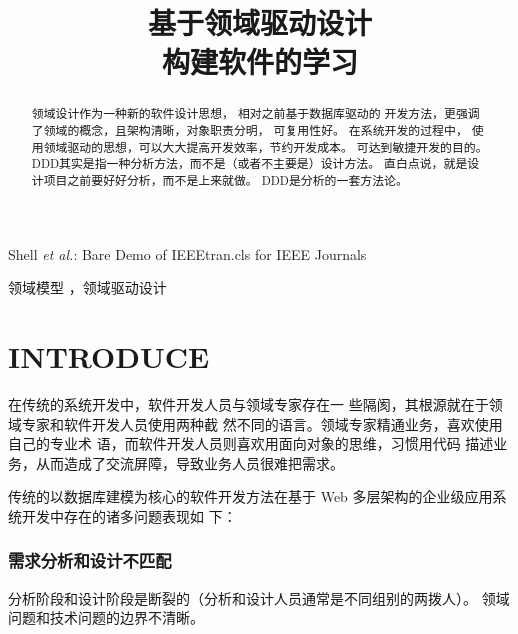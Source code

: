 \documentclass[journal]{IEEEtran}
\begin{document}
\begin{CJK*}{UTF8}{gbsn}


\title{基于领域驱动设计\\构建软件的学习}




%
%

\markboth{ }
{Shell \MakeLowercase{\textit{et al.}}: Bare Demo of IEEEtran.cls for IEEE Journals}


\maketitle



\begin{abstract} 
  领域设计作为一种新的软件设计思想， 相对之前基于数据库驱动的
  开发方法，更强调了领域的概念，且架构清晰，对象职责分明， 可复用性好。 
  在系统开发的过程中，
  使用领域驱动的思想，可以大大提高开发效率，节约开发成本。
  可达到敏捷开发的目的。
  DDD其实是指一种分析方法，而不是（或者不主要是）设计方法。
  直白点说，就是设计项目之前要好好分析，而不是上来就做。
  DDD是分析的一套方法论。  
\end{abstract}


\begin{IEEEkeywords} 
  领域模型 ，领域驱动设计
\end{IEEEkeywords}



\IEEEpeerreviewmaketitle



\section{INTRODUCE}
 
在传统的系统开发中，软件开发人员与领域专家存在一
些隔阂，其根源就在于领域专家和软件开发人员使用两种截
然不同的语言。领域专家精通业务，喜欢使用自己的专业术
语，而软件开发人员则喜欢用面向对象的思维，习惯用代码
描述业务，从而造成了交流屏障，导致业务人员很难把需求。

传统的以数据库建模为核心的软件开发方法在基于 Web
多层架构的企业级应用系统开发中存在的诸多问题表现如
下：

\subsubsection {需求分析和设计不匹配}
分析阶段和设计阶段是断裂的（分析和设计人员通常是不同组别的两拨人）。
领域问题和技术问题的边界不清晰。
 

\end{CJK*}
\end{document}
